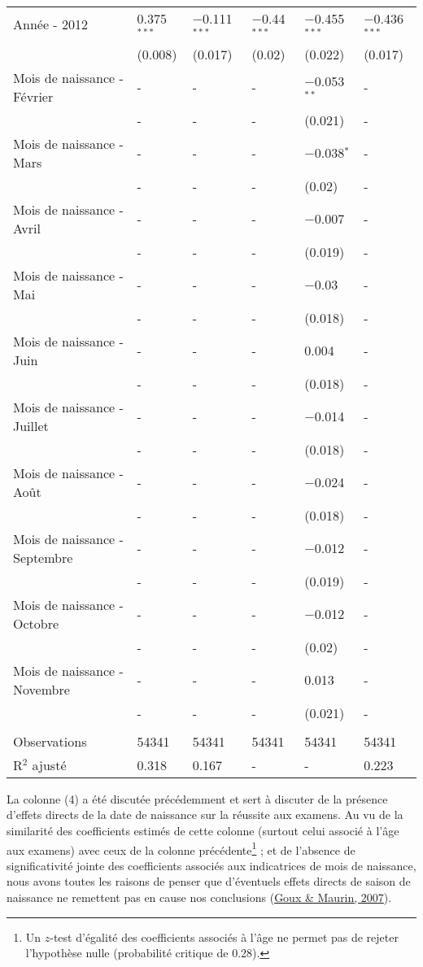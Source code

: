 \documentclass[
]{book}
\begin{document}
\begin{ThreePartTable}
\begin{longtable}[t]{llllll}
Année - 2012 & 0.375$^{***}$ & $-$0.111$^{***}$ & $-$0.44$^{***}$ & $-$0.455$^{***}$ & $-$0.436$^{***}$\\
 & (0.008) & (0.017) & (0.02) & (0.022) & (0.017)\\
Mois de naissance - Février & - & - & - & $-$0.053$^{**}$ & -\\
 & - & - & - & (0.021) & -\\
Mois de naissance - Mars & - & - & - & $-$0.038$^{*}$ & -\\
 & - & - & - & (0.02) & -\\
Mois de naissance - Avril & - & - & - & $-$0.007 & -\\
 & - & - & - & (0.019) & -\\
Mois de naissance - Mai & - & - & - & $-$0.03 & -\\
 & - & - & - & (0.018) & -\\
Mois de naissance - Juin & - & - & - & 0.004 & -\\
 & - & - & - & (0.018) & -\\
Mois de naissance - Juillet & - & - & - & $-$0.014 & -\\
 & - & - & - & (0.018) & -\\
Mois de naissance - Août & - & - & - & $-$0.024 & -\\
 & - & - & - & (0.018) & -\\
Mois de naissance - Septembre & - & - & - & $-$0.012 & -\\
 & - & - & - & (0.019) & -\\
Mois de naissance - Octobre & - & - & - & $-$0.012 & -\\
 & - & - & - & (0.02) & -\\
Mois de naissance - Novembre & - & - & - & 0.013 & -\\
 & - & - & - & (0.021) & -\\
 &  &  &  &  & \\
Observations & 54341 & 54341 & 54341 & 54341 & 54341\\
R$^2$ ajusté & 0.318 & 0.167 & - & - & 0.223\\*
\end{longtable}
\end{ThreePartTable}
\endgroup{}
\newpage

\quad La colonne (4) a été discutée précédemment et sert à discuter de la présence d'effets directs de la date de naissance sur la réussite aux examens. Au vu de la similarité des coefficients estimés de cette colonne (surtout celui associé à l'âge aux examens) avec ceux de la colonne précédente\footnote{Un \(z\)-test d'égalité des coefficients associés à l'âge ne permet pas de rejeter l'hypothèse nulle (probabilité critique de 0.28).} ; et de l'absence de significativité jointe des coefficients associés aux indicatrices de mois de naissance, nous avons toutes les raisons de penser que d'éventuels effets directs de saison de naissance ne remettent pas en cause nos conclusions (\protect\hyperlink{ref-GOU:MAU:07}{Goux \& Maurin, 2007}).
\end{document}
